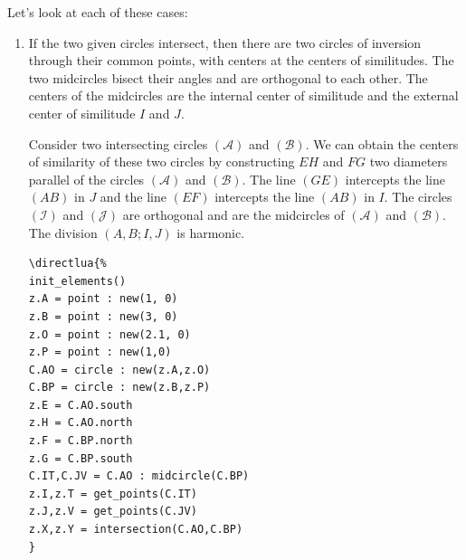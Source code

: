 \vspace{1em}
Let's look at each of these cases:
\begin{enumerate}[label=(\roman*)]
\item If the two given circles intersect, then there are two  circles of inversion through their common points, with centers at the centers of similitudes.  The two midcircles bisect their angles and are orthogonal to each other. The centers of the midcircles are the internal center of similitude and the external center of similitude $I$ and $J$.

Consider two intersecting circles $(\mathcal{A})$ and $(\mathcal{B})$.
We can obtain the centers of similarity of these two circles by constructing $EH$ and $FG$ two diameters parallel of the circles $(\mathcal{A})$ and $(\mathcal{B})$. The  line $(GE)$ intercepts  the line $(AB)$ in $J$ and the line $(EF)$ intercepts the line $(AB)$ in $I$. The circles $(\mathcal{I})$ and $(\mathcal{J})$ are orthogonal and are the midcircles of $(\mathcal{A})$ and $(\mathcal{B})$. The division $(A,B;I,J)$ is harmonic.

\begin{minipage}{.4\textwidth}
\begin{Verbatim}
\directlua{%
init_elements()
z.A = point : new(1, 0)
z.B = point : new(3, 0)
z.O = point : new(2.1, 0)
z.P = point : new(1,0)
C.AO = circle : new(z.A,z.O)
C.BP = circle : new(z.B,z.P)
z.E = C.AO.south
z.H = C.AO.north
z.F = C.BP.north
z.G = C.BP.south
C.IT,C.JV = C.AO : midcircle(C.BP)
z.I,z.T = get_points(C.IT)
z.J,z.V = get_points(C.JV)
z.X,z.Y = intersection(C.AO,C.BP)
}
\end{Verbatim}
\end{minipage}
\begin{minipage}{.5\textwidth}
   \begin{center}
   \end{center}
\end{minipage}


\end{enumerate}

